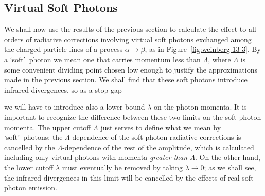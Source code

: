
\subsection{Virtual Soft Photons}

We shall now use the results of the previous section to calculate the
effect to all orders of radiative corrections involving virtual soft photons
exchanged among the charged particle lines of a process $\alpha\to\beta$, as in
Figure~\ref{fig:weinberg-13-3}. By a \lq soft\rq\ photon we mean one that carries momentum less
than $\Lambda$, where $\Lambda$ is some convenient dividing point chosen low enough
to justify the approximations made in the previous section. We shall find
that these soft photons introduce infrared divergences, so as a stop-gap



we will have to introduce also a lower bound $\lambda$ on the photon momenta.
It is important to recognize the difference between these two limits on the
soft photon momenta. The upper cutoff $\Lambda$ just serves to define what we
mean by \lq soft\rq\ photons; the $\Lambda$-dependence of the soft-photon radiative
corrections is cancelled by the $\Lambda$-dependence of the rest of the amplitude,
which is calculated including only virtual photons with momenta \emph{greater
than $\Lambda$}. On the other hand, the lower cutoff $\lambda$ must eventually be removed
by taking $\lambda\to0$; as we shall see, the infrared divergences in this limit will
be cancelled by the effects of real soft photon emission.

